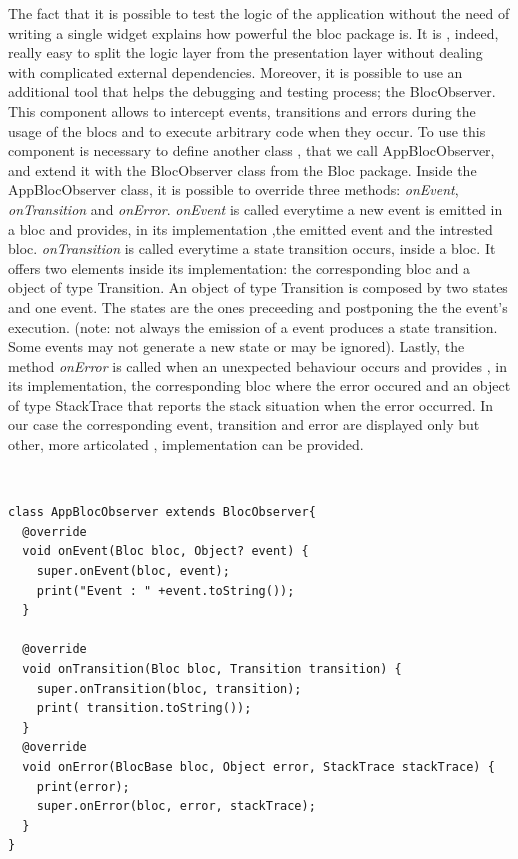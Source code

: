 The fact that it is possible to test the logic of the application without the need of writing a single widget explains how powerful the bloc package is. It is , indeed, really easy to split the logic layer from the presentation layer without dealing with complicated external dependencies. Moreover, it is possible to use an additional tool that helps the debugging and testing process; the BlocObserver. This component allows to intercept events, transitions and errors during the usage of the blocs and to execute arbitrary code when they occur. To use this component is necessary to define another class , that we call AppBlocObserver, and extend it with the BlocObserver class from the Bloc package. Inside the AppBlocObserver class, it is possible to override three methods: \textit{onEvent}, \textit{onTransition }and\textit{ onError}. \textit{onEvent} is called everytime a new event is emitted in a bloc and provides, in its implementation ,the emitted event and the intrested bloc. \textit{onTransition} is called everytime a state transition occurs, inside a bloc. It offers two elements inside its implementation: the corresponding bloc and a object of type Transition. An object of type Transition is composed by two states and one event. The states are the ones preceeding and postponing the the event's execution. (note: not always the emission of a event produces a state transition. Some events may not generate a new state or may be ignored). Lastly, the method \textit{onError} is called when an unexpected behaviour occurs and provides , in its implementation, the corresponding bloc where the error occured and an object of type StackTrace that reports the stack situation when the error occurred. In our case the corresponding event, transition and error are displayed only but other, more articolated , implementation can be provided.
\begin{code}
\mbox{}\\
 \mbox{}
\label{code:2.14}
\begin{verbatim}
class AppBlocObserver extends BlocObserver{
  @override
  void onEvent(Bloc bloc, Object? event) {
    super.onEvent(bloc, event);
    print("Event : " +event.toString());
  }

  @override
  void onTransition(Bloc bloc, Transition transition) {
    super.onTransition(bloc, transition);
    print( transition.toString());
  }
  @override
  void onError(BlocBase bloc, Object error, StackTrace stackTrace) {
    print(error);
    super.onError(bloc, error, stackTrace);
  }
}
\end{verbatim}
\mbox{}
\end{code}

